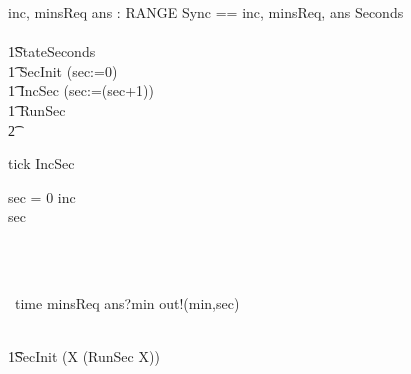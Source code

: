 \begin{circus}
\circchannel inc, minsReq
\also \circchannel ans : RANGE
\also \circchannelset Sync == \lchanset inc, minsReq, ans \rchanset
\also \circprocess Seconds \circdef\ \\
\circbegin\\
\t1\circstate StateSeconds \\
\t1 SecInit \circdef (sec:=0)\\
\t1 IncSec \circdef (sec:=(sec+1))\\
\t1 RunSec \circdef
\\\t2
\begin{block}
\begin{block}
tick \then IncSec \circseq\\
    \begin{block}
      \circif  sec = 0 \circthen inc \then \Skip\\
      \circelse sec  \circthen \Skip \circfi
    \end{block}\\
    \end{block}\\
  \extchoice~time \then minsReq \then ans?min \then out!(min,sec)
      \then \Skip
\end{block}\\
 \t1\circspot SecInit \circseq (\circmu X \circspot (RunSec \circseq X))\\
\circend
\end{circus}

